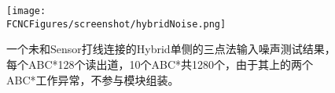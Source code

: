 \begin{figure}[H]
\centering
\texttt{[image: \\FCNCFigures/screenshot/hybridNoise.png]}
\caption{一个未和Sensor打线连接的Hybrid单侧的三点法输入噪声测试结果，每个ABC*128个读出道，10个ABC*共1280个，由于其上的两个ABC*工作异常，不参与模块组装。}
\label{fig:hybridNoise}
\end{figure}